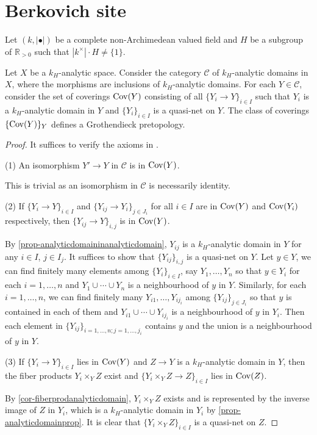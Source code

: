 \section{Berkovich site}
Let $(k,|\bullet|)$ be a complete non-Archimedean valued field and $H$ be a subgroup of $\mathbb{R}_{>0}$ such that $|k^{\times}|\cdot H\neq \{1\}$.

\begin{lemma}\label{lma-admissiblecoveringGtopo}
    Let $X$ be a $k_H$-analytic space. Consider the category $\mathcal{C}$ of $k_H$-analytic domains in $X$, where the morphisms are inclusions of $k_H$-analytic domains. For each $Y\in \mathcal{C}$, consider the set of coverings $\operatorname{Cov}(Y)$ consisting of all $\{Y_i\rightarrow Y\}_{i\in I}$ such that $Y_i$ is a $k_H$-analytic domain in $Y$ and $\{Y_i\}_{i\in I}$ is a quasi-net on $Y$.
    The class of coverings $\{\operatorname{Cov}(Y)\}_Y$ defines a Grothendieck pretopology.
\end{lemma}
\begin{proof}
    It suffices to verify the axioms in \cite[\href{https://stacks.math.columbia.edu/tag/03NH}{Tag 03NH}]{stacks-project}.

    (1) An isomorphism $Y'\rightarrow Y$ in $\mathcal{C}$ is in $\operatorname{Cov}(Y)$.

    This is trivial as an isomorphism in $\mathcal{C}$ is necessarily identity.

    (2) If $\{Y_i\rightarrow Y\}_{i\in I}$ and $\{Y_{ij}\rightarrow Y_i\}_{j\in J_i}$ for all $i\in I$ are in $\operatorname{Cov}(Y)$ and $\operatorname{Cov}(Y_i)$ respectively, then $\{Y_{ij}\rightarrow Y\}_{i,j}$ is in $\operatorname{Cov}(Y)$.

    By \cref{prop-analyticdomaininanalyticdomain}, $Y_{ij}$ is a $k_H$-analytic domain in $Y$ for any $i\in I$, $j\in I_j$. It suffices to show that $\{Y_{ij}\}_{i,j}$ is a quasi-net on $Y$. Let $y\in Y$, we can find finitely many elements among $\{Y_i\}_{i\in I}$, say $Y_1,\ldots,Y_n$ so that $y\in Y_i$ for each $i=1,\ldots,n$ and $Y_1\cup \cdots\cup Y_n$ is a neighbourhood of $y$ in $Y$. Similarly, for each $i=1,\ldots,n$, we can find finitely many $Y_{i1},\ldots,Y_{ij_i}$ among $\{Y_{ij}\}_{j\in J_i}$ so that $y$ is contained in each of them and $Y_{i1}\cup\cdots\cup Y_{ij_i}$ is a neighbourhood of $y$ in $Y_i$. Then each element in $\{Y_{ij}\}_{i=1,\ldots,n;j=1,\ldots,j_i}$ contains $y$ and the union is a neighbourhood of $y$ in $Y$.
    
    (3) If $\{Y_i\rightarrow Y\}_{i\in I}$ lies in $\operatorname{Cov}(Y)$ and $Z\rightarrow Y$ is a $k_H$-analytic domain in $Y$, then the fiber products $Y_i\times_Y Z$ exist and $\{Y_i\times_Y Z\rightarrow Z\}_{i\in I}$ lies in $\operatorname{Cov}(Z)$.

    By \cref{cor-fiberprodanalyticdomain}, $Y_i\times_Y Z$ exists and is represented by the inverse image of $Z$ in $Y_i$, which is a $k_H$-analytic domain in $Y_i$ by \cref{prop-analyticdomainprop}. It is clear that $\{Y_i\times_Y Z\}_{i\in I}$ is a quasi-net on $Z$.
\end{proof}

